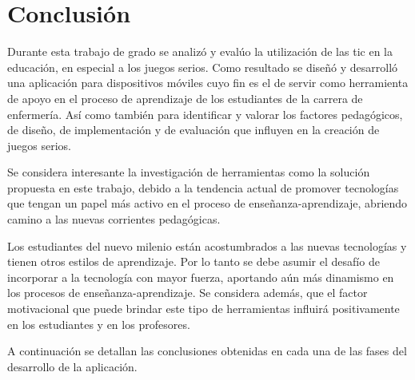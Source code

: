 \chapter{Conclusión}
\label{chap:conclusion}


Durante esta trabajo de grado se analizó y evalúo la utilización de las
\Gls{tic} en la educación, en especial a los juegos serios. Como resultado se
diseñó y desarrolló una aplicación para dispositivos móviles cuyo fin es el de
servir como herramienta de apoyo en el proceso de aprendizaje de los estudiantes
de la carrera de enfermería. Así como también para identificar y valorar
los factores pedagógicos, de diseño, de implementación y de evaluación que
influyen en la creación de juegos serios.

Se considera interesante la investigación de herramientas como la solución
propuesta en este trabajo, debido a la tendencia actual de promover tecnologías
que tengan un papel más activo en el proceso de enseñanza-aprendizaje, abriendo
camino a las nuevas corrientes pedagógicas. 

Los estudiantes del nuevo milenio están acostumbrados a las nuevas tecnologías y
tienen otros estilos de aprendizaje. Por lo tanto se debe asumir el desafío de
incorporar a la tecnología con mayor fuerza, aportando aún más dinamismo en los
procesos de enseñanza-aprendizaje. Se considera además, que el factor motivacional
que puede brindar este tipo de herramientas influirá positivamente en los
estudiantes y en los profesores.

A continuación se detallan las conclusiones obtenidas en cada una de las fases
del desarrollo de la aplicación.



